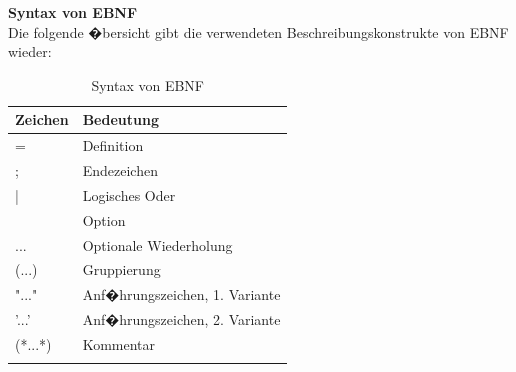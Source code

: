       \textbf{Syntax von EBNF} \\
        Die folgende �bersicht gibt die verwendeten Beschreibungskonstrukte von EBNF \cite{ebnf}
        wieder:
            \begin{longtable}{|l|l|} 
              \hline
              \textbf{Zeichen} & \textbf{Bedeutung} 
              \\ \hline
              \endhead
              = & Definition \\ \hline
              ; & Endezeichen \\ \hline
              | & Logisches Oder \\ \hline
              [...]  & Option \\ \hline
              {...}  & Optionale Wiederholung \\ \hline
              (...)  & Gruppierung \\ \hline
              "..."  & Anf�hrungszeichen, 1. Variante \\ \hline
              '...'  & Anf�hrungszeichen, 2. Variante \\ \hline
              (*...*)  & Kommentar \\ \hline
              \caption{Syntax von EBNF}
              \label{tab:SyntaxVonEBNF}
            \end{longtable}
      
